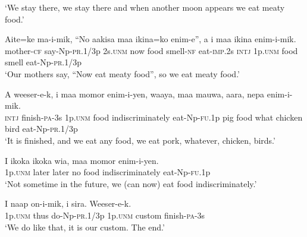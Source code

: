 \glt ‘We stay there, we stay there and when another moon appears we eat meaty food.’ \\
\z


\ea
\gll  Aite=ke  ma-i-mik,  “No  aakisa  maa  ikina=ko  enim-e”,  a        i  maa  ikina  enim-i-mik. \\
mother-\textsc{cf}  say-Np-\textsc{pr}.1/3p  2s.\textsc{unm}  now  food  smell-\textsc{nf}  eat-\textsc{imp}.2s  \textsc{intj} 1p.\textsc{unm}  food  smell  eat-Np-\textsc{pr}.1/3p \\


\glt ‘Our mothers say, “Now eat meaty food”, so we eat meaty food.’ \\
\z


\ea
\gll  A  weeser-e-k,  i  maa  momor  enim-i-yen,  waaya,                maa  mauwa,  aara,  nepa  enim-i-mik. \\
\textsc{intj}  finish-\textsc{pa}-3s  1p.\textsc{unm}  food  indiscriminately  eat-Np-\textsc{fu}.1p  pig   food  what  chicken  bird  eat-Np-\textsc{pr}.1/3p \\


\glt ‘It is finished, and we eat any food, we eat pork, whatever, chicken, birds.’ \\
\z


\ea
\gll  I  ikoka  ikoka  wia,  maa  momor  enim-i-yen. \\
1p.\textsc{unm}  later  later  no  food  indiscriminately  eat-Np-\textsc{fu}.1p \\
\glt ‘Not sometime in the future, we (can now) eat food indiscriminately.’ \\
\z


\ea
\gll  I  naap  on-i-mik,  i  sira.  Weeser-e-k. \\
1p.\textsc{unm}  thus  do-Np-\textsc{pr}.1/3p  1p.\textsc{unm}  custom  finish-\textsc{pa}-3s \\
\glt ‘We do like that, it is our custom. The end.’ \\
\z


